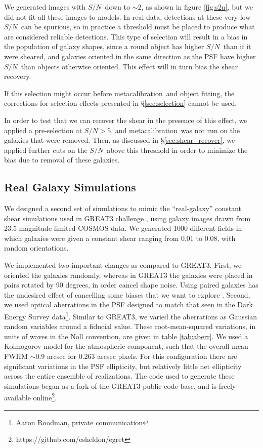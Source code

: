\documentclass[a4paper,fleqn,usenatbib]{mnras}
\newcommand{\snr}{$S/N$}
\newcommand{\mcal}{metacalibration}
\begin{document}
We generated images with \snr\ down to $\sim 2$, as shown in figure
\ref{fig:s2n}, but we did not fit all these images to models.  In real data,
detections at these very low \snr\ can be spurious, so in practice a threshold
must be placed to produce what are considered reliable detections.  This type
of selection will result in a bias in the population of galaxy shapes, since
a round object has higher \snr\ than if it were sheared,
and galaxies oriented in the same direction as the PSF have higher \snr\
than objects otherwise oriented.  This effect will in turn bias
the shear recovery.

If this selection might occur before \mcal\ and object fitting, the corrections
for selection effects presented in \S \ref{sec:selection} cannot be used.

In order to test that we can recover the shear in the presence of this effect,
we applied a pre-selection at \snr$ > 5$, and \mcal\ was not run on the
galaxies that were removed.  Then, as discussed in \S \ref{sec:shear_recover},
we applied further cuts on the \snr\ above this threshold in order to minimize
the bias due to removal of these galaxies.


\subsection{Real Galaxy Simulations} \label{sec:cosmosim}

We designed a second set of simulations to mimic the ``real-galaxy'' constant
shear simulations used in GREAT3 challenge \citep{great3}, using galaxy images
drawn from 23.5 magnitude limited COSMOS data.  We generated 1000 different
fields in which galaxies were given a constant shear ranging from 0.01 to 0.08,
with random orientations.

We implemented two important changes as compared to GREAT3.  First, we oriented
the galaxies randomly, whereas in GREAT3 the galaxies were placed in pairs
rotated by 90 degrees, in order cancel shape noise.  Using paired galaxies has
the undesired effect of cancelling some biases that we want to explore
\citep{DESSVShear}.  Second, we used optical aberrations in the PSF designed to
match that seen in the Dark Energy Survey data\footnote{Aaron Roodman, private
communication}.  Similar to GREAT3, we varied the aberrations as Gaussian
random variables around a fiducial value. These root-mean-squared variations,
in units of waves in the Noll convention, are given in table \ref{tab:aberr}.
We used a Kolmogorov model for the atmospheric component, such that
the overall mean FWHM $\sim 0.9$ arcsec for 0.263 arcsec pixels.
For this configuration there are
significant variations in the PSF ellipticity, but relatively little net
ellipticity across the entire ensemble of realizations.  The code used to
generate these simulations began as a fork of the GREAT3 public code base, and
is freely available online\footnote{https://github.com/esheldon/egret}.
\end{document}
